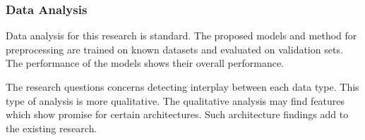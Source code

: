 \subsubsection{Data Analysis}

Data analysis for this research is standard.  The proposed models and method for preprocessing are trained on known datasets and evaluated on validation sets.  The performance of the models shows their overall performance.

The research questions concerns detecting interplay between each data type.  This type of analysis is more qualitative.  The qualitative analysis may find features which show promise for certain architectures. Such architecture findings add to the existing research.  
